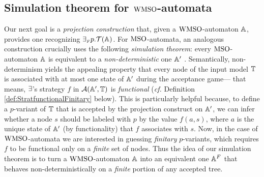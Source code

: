\subsection{Simulation theorem for $\mathrm{WMSO}$-automata}\label{sec:simulationwmso}

\noindent Our next goal is a \emph{projection construction} that, given
a $\mathrm{WMSO}$-automaton $\mathbb{A}$, provides one recognizing ${\exists_{{\scriptscriptstyle F}} p}.\mathcal{T}(\mathbb{A})$. For $\mathrm{MSO}$-automata, an analogous construction crucially uses the following \emph{simulation theorem}: every
$\mathrm{MSO}$-automaton $\mathbb{A}$ is equivalent to a \emph{non-deterministic} one $\mathbb{A}'$ \cite{Walukiewicz96}.
Semantically, non-determinism yields the appealing property that every node of the input model $\mathbb{T}$ is associated with at most one state of $\mathbb{A}'$ during the acceptance game--- that means, $\exists$'s strategy $f$ in $\mathcal{A}(\mathbb{A}',\mathbb{T})$ is \emph{functional} (\emph{cf.} Definition \ref{def:StratfunctionalFinitary} below). This is particularly helpful because, to define a $p$-variant of $\mathbb{T}$
that is accepted by the projection construct on $\mathbb{A}'$, we
can infer whether a node $s$ should be labeled with $p$ by the value $f(a,s)$, where $a$ is the unique state of $\mathbb{A}'$ (by functionality) that $f$ associates with $s$. Now, in the case of $\mathrm{WMSO}$-automata we are interested in guessing
\emph{finitary} $p$-variants, which requires $f$ to be functional only on a \emph{finite} set of nodes. Thus the idea of our simulation theorem is to turn a $\mathrm{WMSO}$-automaton $\mathbb{A}$ into an equivalent one $\mathbb{A}^{F}$ that behaves non-deterministically on a \emph{finite} portion of any accepted tree.

